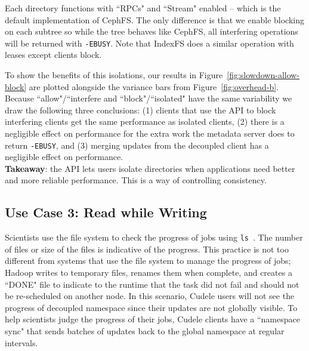 Each directory functions with ``RPCs"
and ``Stream" enabled -- which is the default implementation of CephFS. The only
difference is that we enable blocking on each subtree so while the tree behaves
like CephFS, all interfering operations will be returned with \texttt{-EBUSY}.
Note that IndexFS does a similar operation with leases except clients block.

To show the benefits of this isolations, our results in
Figure~\ref{fig:slowdown-allow-block} are plotted alongside the variance bars from
Figure~\ref{fig:overhead-b}. Because ``allow"/``interfere and
``block"/``isolated" have the same variability we draw the following three
conclusions: (1) clients that use the API to block interfering clients  get
the same performance as isolated clients, (2) there is a negligible effect on
performance for the extra work the metadata server does to return
\texttt{-EBUSY}, and (3) merging updates from the decoupled client has a
negligible effect on performance.\\

\noindent\textbf{Takeaway}: the API lets users isolate directories when
applications need better and more reliable performance. This is a way of
controlling consistency.

\subsection{Use Case 3: Read while Writing}

Scientists use the file system to check the progress of jobs using
\texttt{ls}~\cite{CITEME}. The number of files or size of the files is
indicative of the progress. This practice is not too different from systems
that use the file system to manage the progress of jobs; Hadoop writes to
temporary files, renames them when complete, and creates a ``DONE" file to
indicate to the runtime that the task did not fail and should not be
re-scheduled on another node. In this scenario, Cudele users will not see the
progress of decoupled namespace since their updates are not globally visible.
To help scientists judge the progress of their jobs, Cudele clients have a
``namespace sync" that sends batches of updates back to the global namespace at
regular intervals.


